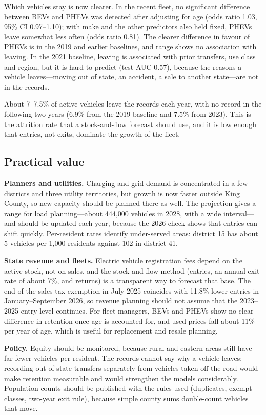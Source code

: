 \documentclass{xmum_asg}
\begin{document}
Which vehicles stay is now clearer. In the recent fleet, no significant difference between BEVs and PHEVs was detected after adjusting for age (odds ratio 1.03, 95\% CI 0.97--1.10); with make and the other predictors also held fixed, PHEVs leave somewhat less often (odds ratio 0.81). The clearer difference in favour of PHEVs is in the 2019 and earlier baselines, and range shows no association with leaving. In the 2021 baseline, leaving is associated with prior transfers, use class and region, but it is hard to predict (test AUC 0.57), because the reasons a vehicle leaves---moving out of state, an accident, a sale to another state---are not in the records.

About 7--7.5\% of active vehicles leave the records each year, with no record in the following two years (6.9\% from the 2019 baseline and 7.5\% from 2023). This is the attrition rate that a stock-and-flow forecast should use, and it is low enough that entries, not exits, dominate the growth of the fleet.

\subsection{Practical value}

\textbf{Planners and utilities.} Charging and grid demand is concentrated in a few districts and three utility territories, but growth is now faster outside King County, so new capacity should be planned there as well. The projection gives a range for load planning---about 444,000 vehicles in 2028, with a wide interval---and should be updated each year, because the 2026 check shows that entries can shift quickly. Per-resident rates identify under-served areas: district 15 has about 5 vehicles per 1,000 residents against 102 in district 41.

\textbf{State revenue and fleets.} Electric vehicle registration fees depend on the active stock, not on sales, and the stock-and-flow method (entries, an annual exit rate of about 7\%, and returns) is a transparent way to forecast that base. The end of the sales-tax exemption in July 2025 coincides with 11.8\% lower entries in January--September 2026, so revenue planning should not assume that the 2023--2025 entry level continues. For fleet managers, BEVs and PHEVs show no clear difference in retention once age is accounted for, and used prices fall about 11\% per year of age, which is useful for replacement and resale planning.

\textbf{Policy.} Equity should be monitored, because rural and eastern areas still have far fewer vehicles per resident. The records cannot say why a vehicle leaves; recording out-of-state transfers separately from vehicles taken off the road would make retention measurable and would strengthen the models considerably. Population counts should be published with the rules used (duplicates, exempt classes, two-year exit rule), because simple county sums double-count vehicles that move.
\end{document}
